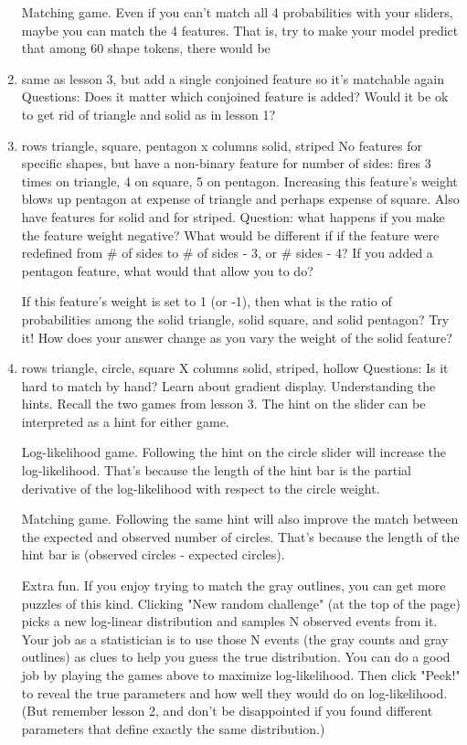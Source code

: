 \documentclass[11pt,letterpaper]{article}
\begin{document}
\begin{enumerate}
Matching game. Even if you can't match all 4 probabilities with your sliders, maybe you can match the 4 features. That is, try to make your model predict that among 60 shape tokens, there would be
\item same as lesson 3, but add a single conjoined feature so it’s matchable again Questions: Does it matter which conjoined feature is added?  Would it be ok to get rid of triangle and solid as in lesson 1?
\item rows {triangle, square, pentagon} x columns {solid, striped}
No features for specific shapes, but have a non-binary feature for number of sides: fires 3 times on triangle, 4 on square, 5 on pentagon.  Increasing this feature’s weight blows up pentagon at expense of triangle and perhaps expense of square.  Also have features for solid and for striped.
Question: what happens if you make the feature weight negative?  What would be different if if the feature were redefined from \# of sides to \# of sides - 3, or \# sides - 4?  If you added a pentagon feature, what would that allow you to do?

If this feature's weight is set to 1 (or -1), then what is the ratio of probabilities among the solid triangle, solid square, and solid pentagon? Try it! How does your answer change as you vary the weight of the solid feature?
\item rows {triangle, circle, square} X columns {solid, striped, hollow}
Questions: Is it hard to match by hand?  Learn about gradient display.
Understanding the hints. Recall the two games from lesson 3. The hint on the slider can be interpreted as a hint for either game.

Log-likelihood game. Following the hint on the circle slider will increase the log-likelihood. That's because the length of the hint bar is the partial derivative of the log-likelihood with respect to the circle weight.

Matching game. Following the same hint will also improve the match between the expected and observed number of circles. That's because the length of the hint bar is (observed circles - expected circles).


Extra fun. If you enjoy trying to match the gray outlines, you can get more puzzles of this kind. Clicking "New random challenge" (at the top of the page) picks a new log-linear distribution and samples N observed events from it. Your job as a statistician is to use those N events (the gray counts and gray outlines) as clues to help you guess the true distribution. You can do a good job by playing the games above to maximize log-likelihood. Then click "Peek!" to reveal the true parameters and how well they would do on log-likelihood. (But remember lesson 2, and don't be disappointed if you found different parameters that define exactly the same distribution.)


\end{enumerate}
\end{document}
